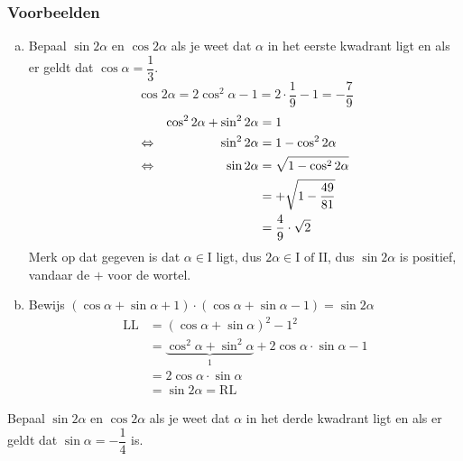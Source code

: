 \documentclass[twoside,a4paper,12pt]{article}
\begin{document}
\subsubsection*{Voorbeelden}
\begin{enumerate}[(a)]
  \item Bepaal $\sin 2\alpha$ en $\cos 2\alpha$ als je weet dat $\alpha$ in het eerste kwadrant ligt en als er geldt dat $\cos\alpha=\dfrac{1}{3}$.
    $$\cos 2\alpha = 2\cos^2\alpha - 1 = 2\cdot \dfrac{1}{9}-1=-\dfrac{7}{9}$$
    \begin{align*}
           && \cos^2 2\alpha + \sin^2 2\alpha &= 1\\
      \Leftrightarrow &&                  \sin^2 2\alpha &= 1 - \cos^2 2\alpha\\
      \Leftrightarrow &&                  \sin 2\alpha   &= \sqrt{1 - \cos^2 2\alpha}\\
           &&                                 &= + \sqrt{1 - \dfrac{49}{81}}\\
           &&                                 &= \dfrac{4}{9}\cdot\sqrt{2}
    \end{align*}
    Merk op dat gegeven is dat $\alpha\in\mbox{I}$ ligt, dus $2\alpha\in\mbox{I of II}$, dus $\sin 2\alpha$ is positief, vandaar de $+$ voor de wortel.
    \item Bewijs $(\cos \alpha + \sin \alpha + 1)\cdot(\cos\alpha + \sin\alpha - 1)=\sin 2\alpha$
    \begin{align*}
      \mbox{LL} &= (\cos\alpha + \sin\alpha)^2 - 1^2\\
                &= \underbrace{\cos^2\alpha + \sin^2\alpha}_1 + 2\cos\alpha\cdot\sin\alpha - 1\\
                &= 2\cos\alpha\cdot\sin\alpha\\
                &= \sin 2\alpha = \mbox{RL}
    \end{align*}
\end{enumerate}

\begin{oefening}
Bepaal $\sin 2\alpha$ en $\cos 2\alpha$ als je weet dat $\alpha$ in het derde kwadrant ligt en als er geldt dat $\sin\alpha=-\dfrac{1}{4}$ is.
\end{oefening}
\end{document}
